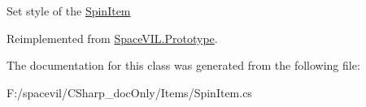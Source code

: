 Set style of the \mbox{\hyperlink{class_space_v_i_l_1_1_spin_item}{Spin\+Item}} 



Reimplemented from \mbox{\hyperlink{class_space_v_i_l_1_1_prototype_ae96644a6ace490afb376fb542161e541}{Space\+V\+I\+L.\+Prototype}}.



The documentation for this class was generated from the following file\+:\begin{DoxyCompactItemize}
\item 
F\+:/spacevil/\+C\+Sharp\+\_\+doc\+Only/\+Items/Spin\+Item.\+cs\end{DoxyCompactItemize}
